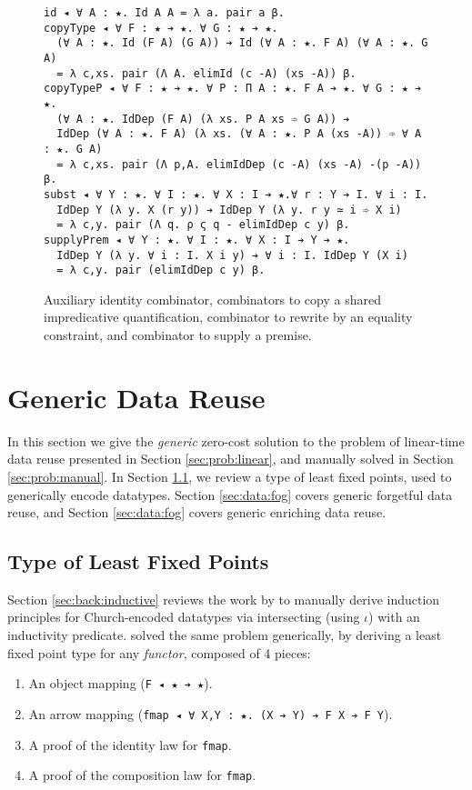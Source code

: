 \documentclass[acmsmall]{acmart}\settopmatter{}
\newcommand{\refsec}[1]{Section \ref{sec:#1}}
\newcommand{\labsec}[1]{\label{sec:#1}}
\newcommand{\labfig}[1]{\label{fig:#1}}
\begin{document}
\begin{figure}
\centering

\begin{verbatim}
id ◂ ∀ A : ★. Id A A = λ a. pair a β.
copyType ◂ ∀ F : ★ ➔ ★. ∀ G : ★ ➔ ★.
  (∀ A : ★. Id (F A) (G A)) ➔ Id (∀ A : ★. F A) (∀ A : ★. G A)
  = λ c,xs. pair (Λ A. elimId (c -A) (xs -A)) β.
copyTypeP ◂ ∀ F : ★ ➔ ★. ∀ P : Π A : ★. F A ➔ ★. ∀ G : ★ ➔ ★.
  (∀ A : ★. IdDep (F A) (λ xs. P A xs ➾ G A)) ➔
  IdDep (∀ A : ★. F A) (λ xs. (∀ A : ★. P A (xs -A)) ➾ ∀ A : ★. G A)
  = λ c,xs. pair (Λ p,A. elimIdDep (c -A) (xs -A) -(p -A)) β.
subst ◂ ∀ Y : ★. ∀ I : ★. ∀ X : I ➔ ★.∀ r : Y ➔ I. ∀ i : I.
  IdDep Y (λ y. X (r y)) ➔ IdDep Y (λ y. r y ≃ i ➾ X i)
  = λ c,y. pair (Λ q. ρ ς q - elimIdDep c y) β.
supplyPrem ◂ ∀ Y : ★. ∀ I : ★. ∀ X : I ➔ Y ➔ ★.
  IdDep Y (λ y. ∀ i : I. X i y) ➔ ∀ i : I. IdDep Y (X i)
  = λ c,y. pair (elimIdDep c y) β.
\end{verbatim}

\caption{Auxiliary identity combinator, combinators to copy a shared
  impredicative quantification, combinator to rewrite by
  an equality constraint, and combinator to supply a premise.} 
\labfig{aux}
\end{figure}

\section{Generic Data Reuse}
\labsec{data}

In this section we give the \textit{generic} zero-cost solution to the problem of
linear-time data reuse presented in \refsec{prob:linear}, and manually
solved in \refsec{prob:manual}. In \refsec{data:fix}, we review a
type of least fixed points, used to generically encode datatypes.
\refsec{data:fog} covers generic forgetful data reuse, and
\refsec{data:fog} covers generic enriching data reuse.

\subsection{Type of Least Fixed Points}
\labsec{data:fix}

\refsec{back:inductive} reviews the work by \citet{stump18} to
manually derive induction principles for Church-encoded datatypes via
intersecting (using $\iota$) with an inductivity predicate.
\citet{firsov18a} solved the same problem generically, by deriving a
least fixed point type for any \textit{functor}, composed of 4 pieces:
\begin{enumerate}
\item An object mapping (\verb;F ◂ ★ ➔ ★;).
\item An arrow mapping
  (\verb;fmap ◂ ∀ X,Y : ★. (X ➔ Y) ➔ F X ➔ F Y;).
\item A proof of the identity law for \verb;fmap;.
\item A proof of the composition law for \verb;fmap;.
\end{enumerate}
\end{document}
